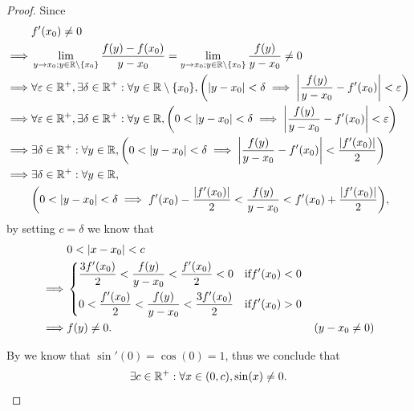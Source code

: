 \begin{proof}
  Since
  \begin{align*}
             & f'(x_0) \neq 0                                                                                                                                                                                \\
    \implies & \lim_{y \to x_0 ; y \in \R \setminus \set{x_0}} \dfrac{f(y) - f(x_0)}{y - x_0} = \lim_{y \to x_0 ; y \in \R \setminus \set{x_0}} \dfrac{f(y)}{y - x_0} \neq 0                                 \\
    \implies & \forall \varepsilon \in \R^+, \exists \delta \in \R^+ : \forall y \in \R \setminus \set{x_0}, \bigg(\abs{y - x_0} < \delta \implies \abs{\dfrac{f(y)}{y - x_0} - f'(x_0)} < \varepsilon\bigg) \\
    \implies & \forall \varepsilon \in \R^+, \exists \delta \in \R^+ : \forall y \in \R, \bigg(0 < \abs{y - x_0} < \delta \implies \abs{\dfrac{f(y)}{y - x_0} - f'(x_0)} < \varepsilon\bigg)                 \\
    \implies & \exists \delta \in \R^+ : \forall y \in \R, \bigg(0 < \abs{y - x_0} < \delta \implies \abs{\dfrac{f(y)}{y - x_0} - f'(x_0)} < \dfrac{\abs{f'(x_0)}}{2}\bigg)                                  \\
    \implies & \exists \delta \in \R^+ : \forall y \in \R,                                                                                                                                                   \\
             & \bigg(0 < \abs{y - x_0} < \delta \implies f'(x_0) - \dfrac{\abs{f'(x_0)}}{2} < \dfrac{f(y)}{y - x_0} < f'(x_0) + \dfrac{\abs{f'(x_0)}}{2}\bigg),
  \end{align*}
  by setting \(c = \delta\) we know that
  \begin{align*}
             & 0 < \left\lvert x - x_0\right\rvert < c                                                                                               \\
    \implies & \begin{dcases}
                 \dfrac{3 f'(x_0)}{2} < \dfrac{f(y)}{y - x_0} < \dfrac{f'(x_0)}{2} < 0 & \text{if} f'(x_0) < 0 \\
                 0 < \dfrac{f'(x_0)}{2} < \dfrac{f(y)}{y - x_0} < \dfrac{3 f'(x_0)}{2} & \text{if} f'(x_0) > 0
               \end{dcases}                       \\
    \implies & f(y) \neq 0.                                                                                     & (y - x_0 \neq 0)
  \end{align*}

  By  we know that \(\sin'(0) = \cos(0) = 1\), thus we conclude that
  \[
    \exists c \in \mathbb{R}^+ : \forall x \in (0, c), \sin(x) \neq 0.
  \]
\end{proof}

